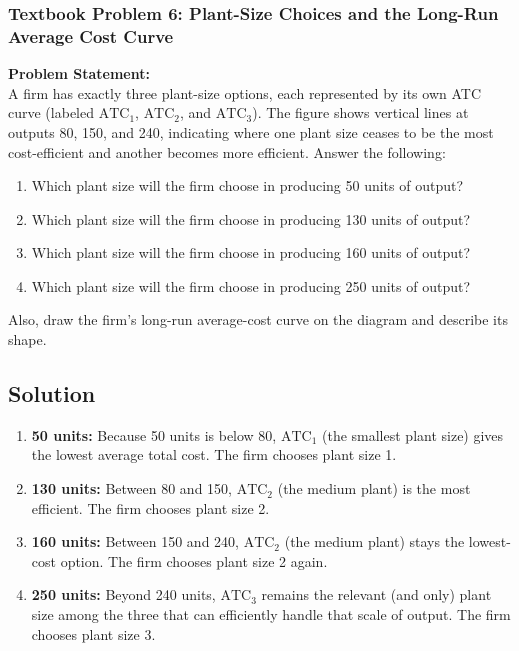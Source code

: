 \documentclass[12pt]{article}
\begin{document}
\subsubsection*{Textbook Problem 6: Plant-Size Choices and the Long-Run Average Cost Curve}
\textbf{Problem Statement:} \\
A firm has exactly three plant-size options, each represented by its own ATC curve (labeled \(\text{ATC}_1\), \(\text{ATC}_2\), and \(\text{ATC}_3\)). The figure shows vertical lines at outputs 80, 150, and 240, indicating where one plant size ceases to be the most cost-efficient and another becomes more efficient. Answer the following:
\begin{enumerate}[label=(\alph*)]
  \item Which plant size will the firm choose in producing 50 units of output?
  \item Which plant size will the firm choose in producing 130 units of output?
  \item Which plant size will the firm choose in producing 160 units of output?
  \item Which plant size will the firm choose in producing 250 units of output?
\end{enumerate}
Also, draw the firm’s long-run average-cost curve on the diagram and describe its shape.

\subsection*{Solution}
\begin{enumerate}[label=(\alph*)]
  \item \textbf{50 units:} Because 50 units is below 80, \(\text{ATC}_1\) (the smallest plant size) gives the lowest average total cost. The firm chooses plant size 1.
  \item \textbf{130 units:} Between 80 and 150, \(\text{ATC}_2\) (the medium plant) is the most efficient. The firm chooses plant size 2.
  \item \textbf{160 units:} Between 150 and 240, \(\text{ATC}_2\) (the medium plant) stays the lowest-cost option. The firm chooses plant size 2 again.
  \item \textbf{250 units:} Beyond 240 units, \(\text{ATC}_3\) remains the relevant (and only) plant size among the three that can efficiently handle that scale of output. The firm chooses plant size 3.
\end{enumerate}
\end{document}
